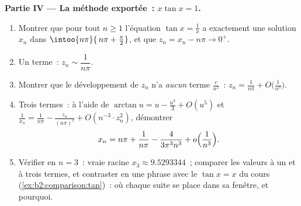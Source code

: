 \begin{problem}
\medskip
\noindent\textbf{Partie IV --- La méthode exportée~: $x\tan x =
1$.}
\begin{enumerate}[resume]
  \item Montrer que pour tout $n \geq 1$ l'équation $\tan x =
        \frac1x$ a exactement une solution $x_n$ dans
        $\intoo{n\pi}{\,n\pi + \frac\pi2}$, et que $z_n = x_n
        - n\pi \to 0^+$.
  \item Un terme~: $z_n \sim \dfrac{1}{n\pi}$.
  \item Montrer que le développement de $z_n$ n'a \emph{aucun}
        terme $\frac{c}{n^2}$~: $z_n = \frac1{n\pi} +
        O\bigl(\frac{1}{n^3}\bigr)$.
  \item Trois termes~: à l'aide de $\arctan u = u - \frac{u^3}3 +
        O(u^5)$ et $\frac1{x_n} = \frac{1}{n\pi} -
        \frac{z_n}{(n\pi)^2} + O(n^{-3}\cdot z_n^2)$, démontrer
        \[
        x_n = n\pi + \frac{1}{n\pi} -
        \frac{4}{3\pi^3 n^3} + o\Bigl(\frac{1}{n^3}\Bigr).
        \]
  \item Vérifier en $n = 3$~: vraie racine $x_3 \approx 9.5293344$~;
        comparer les valeurs à un et à trois termes, et contraster en
        une phrase avec le $\tan x = x$ du cours
        (\cref{ex:b2:comparison:tan})~: où chaque suite se place
        dans sa fenêtre, et pourquoi.
\end{enumerate}


\end{problem}
